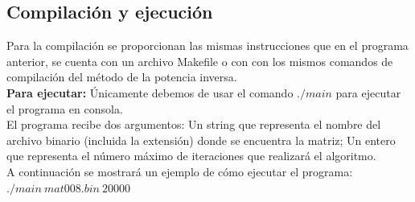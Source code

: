 \documentclass[12pt]{article}
\begin{document}
\subsection{Compilación y ejecución}
Para la compilación se proporcionan las mismas instrucciones que en el programa anterior, se cuenta con un archivo Makefile o con con los mismos comandos de compilación del método de la potencia inversa.\\

\textbf{Para ejecutar:} Únicamente debemos de usar el comando $./main$ para ejecutar el programa en consola.\\
El programa recibe dos argumentos: Un string que representa el nombre del archivo binario (incluida la extensión) donde se encuentra la matriz; Un entero que representa el número máximo de iteraciones que realizará el algoritmo.\\
A continuación se mostrará un ejemplo de cómo ejecutar el programa:\\

$./main\ mat008.bin\ 20000$
\end{document}
